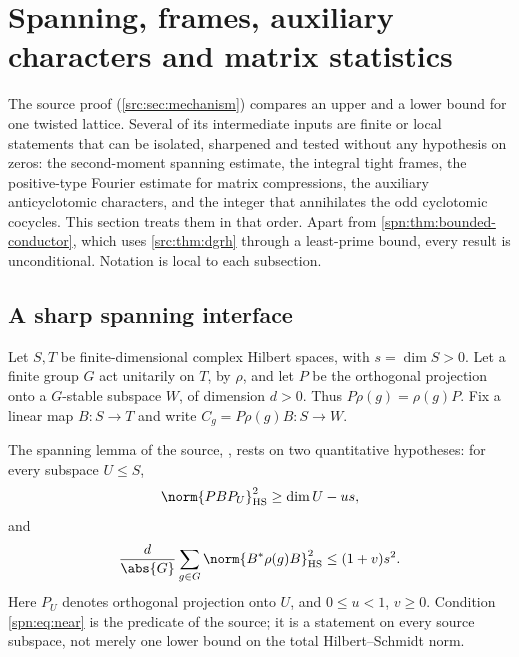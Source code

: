 \section{Spanning, frames, auxiliary characters and matrix statistics}\label{sec:spn}

\providecommand{\spnHS}{\mathrm{HS}}
\providecommand{\spncodim}{\operatorname{codim}}
\providecommand{\spnim}{\operatorname{im}}
\providecommand{\spnE}{\mathbb{E}}
\providecommand{\spnP}{\mathbb{P}}
\providecommand{\spnTV}{d_{\mathrm{TV}}}
\providecommand{\spnStab}{\operatorname{Stab}}
\providecommand{\spnMat}{\operatorname{Mat}}
\providecommand{\spnDD}{\mathfrak{D}}
\providecommand{\spnT}{\mathsf{T}}
\providecommand{\spnqbin}[3]{\genfrac{[}{]}{0pt}{}{#1}{#2}_{#3}}
\providecommand{\spnOrth}{\mathcal{O}}
\providecommand{\spnTame}{\mathcal{T}}
\providecommand{\spnEmb}{\mathcal{E}}
\providecommand{\spnAlt}{\operatorname{Alt}}
\providecommand{\spncoker}{\operatorname{coker}}

The source proof (\cref{src:sec:mechanism}) compares an upper and a lower bound
for one twisted lattice. Several of its intermediate inputs are finite or local
statements that can be isolated, sharpened and tested without any hypothesis on
zeros: the second-moment spanning estimate, the integral tight frames, the
positive-type Fourier estimate for matrix compressions, the auxiliary
anticyclotomic characters, and the integer that annihilates the odd cyclotomic
cocycles. This section treats them in that order. Apart from
\cref{spn:thm:bounded-conductor}, which uses \cref{src:thm:dgrh} through a
least-prime bound, every result is unconditional. Notation is local to each
subsection.

\subsection{A sharp spanning interface}\label{spn:sec:spanning}

Let $S,T$ be finite-dimensional complex Hilbert spaces, with $s=\dim S>0$. Let a
finite group $G$ act unitarily on $T$, by $\rho$, and let $P$ be the orthogonal
projection onto a $G$-stable subspace $W$, of dimension $d>0$. Thus
$P\rho(g)=\rho(g)P$. Fix a linear map $B\colon S\to T$ and write
$C_g=P\rho(g)B\colon S\to W$.

The spanning lemma of the source, , rests on
two quantitative hypotheses: for every subspace $U\le S$,
\begin{equation}\label{spn:eq:near}
 \norm{PBP_U}_{\spnHS}^2\ge \dim U-us,
\end{equation}
and
\begin{equation}\label{spn:eq:moment}
 \frac d{\abs{G}}\sum_{g\in G}\norm{B^*\rho(g)B}_{\spnHS}^2\le(1+v)s^2 .
\end{equation}
Here $P_U$ denotes orthogonal projection onto $U$, and $0\le u<1$, $v\ge0$.
Condition \eqref{spn:eq:near} is the predicate  of the
source; it is a statement on every source subspace, not merely one lower
bound on the total Hilbert--Schmidt norm.

